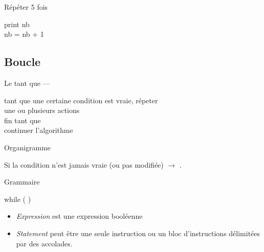 \begin{hideedit}
\begin{frame}
  \pause
  \begin{block}{Répéter 5 fois}
  \begin{langagenaturel}
    print nb\\
    nb = nb + 1
  \end{langagenaturel}
  \end{block}
\end{frame}

\subsection{Boucle }
\begin{frame}{Le \og tant que \fg --- }
  \begin{langagenaturel}
    tant que une certaine condition est vraie, répeter\\
      \tab une ou plusieurs actions\\
    fin tant que\\
    continuer l'algorithme 
  \end{langagenaturel}
\end{frame}

\begin{frame}{Organigramme}

  \pause
  Si la condition n'est jamais vraie (ou pas modifiée) \(\rightarrow\)
  .
\end{frame}

\begin{frame}[fragile]{Grammaire}
  \begin{grammaire}
    while (  )
  \end{grammaire}

  \begin{itemize}
    \item \textit{Expression} est une expression booléenne
    \item \textit{Statement} peut être une seule instruction ou un bloc
      d'instructions délimitées par des accolades.
  \end{itemize}
\end{frame}


\end{hideedit}
